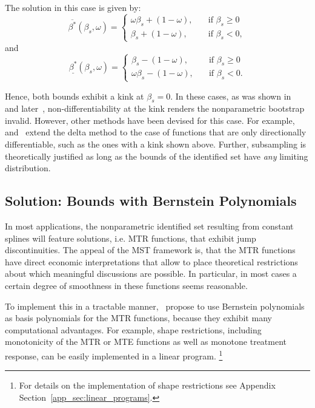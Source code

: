 \documentclass[12pt,a4paper,english]{article} %
\numberwithin{equation}{section}
\theoremstyle{definition}
\theoremstyle{remark}
\theoremstyle{plain}
\begin{document}
The solution in this case is given by:
\begin{equation}\label{eq:solution_cs_increasing_mtr_upper}
	\overline{\beta^*}(\beta_s, \omega)=
	\begin{cases}
		\omega \beta_s + (1 - \omega),& \quad \text{if } \beta_s \geq 0\\
		\beta_s + (1 - \omega),              & \quad \text{if } \beta_s < 0,
	\end{cases}
\end{equation}
and
\begin{equation}\label{eq:solution_cs_increasing_mtr_lower}
	\underline{\beta^*}(\beta_s, \omega)=
	\begin{cases}
		\beta_s - (1 - \omega),& \quad \text{if } \beta_s \geq 0\\
		\omega \beta_s - (1 - \omega),              & \quad \text{if } \beta_s < 0.
	\end{cases}
\end{equation}

Hence, both bounds exhibit a kink at $\beta_s=0$.
In these cases, as was shown in~\cite{dumbgen1993nondifferentiable} and later~\cite{fang2019infdirdiff}, non-differentiability at the kink renders the nonparametric bootstrap invalid.
However, other methods have been devised for this case. For example,~\cite{fang2019infdirdiff} and~\cite{hong2018numerical} extend the delta method to the case of functions that are only directionally differentiable, such as the ones with a kink shown above.
Further, subsampling is theoretically justified as long as the bounds of the identified set have \textit{any} limiting distribution.

\subsection{Solution: Bounds with Bernstein Polynomials}
In most applications, the nonparametric identified set resulting from constant splines will feature solutions, i.e. MTR functions, that exhibit jump discontinuities.
The appeal of the MST framework is, that the MTR functions have direct economic interpretations that allow to place theoretical restrictions about which meaningful discussions are possible.
In particular, in most cases a certain degree of smoothness in these functions seems reasonable.

To implement this in a tractable manner,~\cite{mogstad2018using} propose to use Bernstein polynomials as basis polynomials for the MTR functions, because they exhibit many computational advantages.
For example, shape restrictions, including monotonicity of the MTR or MTE functions as well as monotone treatment response, can be easily implemented in a linear program.
\footnote{For details on the implementation of shape restrictions see Appendix Section~\ref{app_sec:linear_programs}.}
\end{document}
